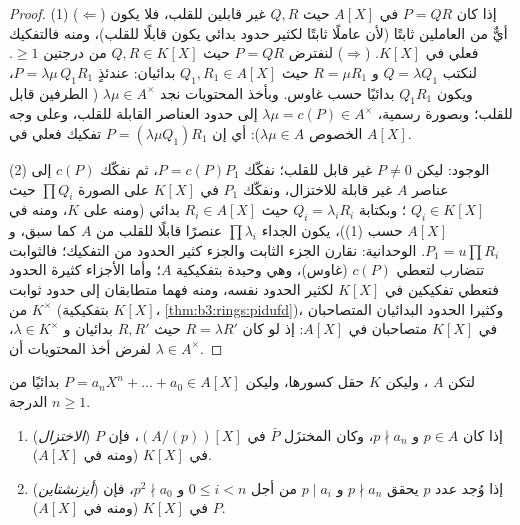 \begin{proof}
(1) ($\Leftarrow$) إذا كان $P = QR$ في $A[X]$ حيث $Q, R$ غير
قابلين للقلب، فلا يكون أيٌّ من العاملين ثابتًا (لأن عاملًا ثابتًا
لكثير حدود بدائي يكون قابلًا للقلب)، ومنه فالتفكيك فعلي في
$K[X]$. ($\Rightarrow$) لنفترض $P = QR$ حيث $Q, R \in K[X]$ من
درجتين $\geq 1$. لنكتب $Q = \lambda Q_1$ و $R = \mu R_1$ حيث $Q_1, R_1
\in A[X]$
بدائيان: عندئذٍ $P = \lambda\mu\, Q_1R_1$، ويكون $Q_1R_1$ بدائيًا حسب غاوس.
وبأخذ المحتويات نجد $\lambda\mu \in A^\times$ ( الطرفين قابل للقلب؛ وبصورة
رسمية، $\lambda\mu = c(P) \in
A^\times$ إلى حدود العناصر القابلة للقلب، وعلى وجه الخصوص
$\lambda \mu \in A$): أي إن $P
= (\lambda\mu Q_1) R_1$ تفكيك فعلي في $A[X]$.

(2) الوجود: ليكن $P \neq 0$ غير قابل للقلب؛ نفكّك $P = c(P)P_1$،
ثم نفكّك $c(P)$ إلى عناصر $A$ غير قابلة للاختزال، ونفكّك $P_1$
في  $K[X]$ على الصورة $\prod Q_i$ حيث
$Q_i \in K[X]$ ؛ وبكتابة $Q_i = \lambda_i R_i$ حيث
$R_i \in A[X]$ بدائي (ومنه  على $K$، ومنه في
$A[X]$ حسب (1))، يكون الجداء $\prod \lambda_i$ عنصرًا قابلًا للقلب من $A$
كما سبق، و $P_1 = u\prod
R_i$. الوحدانية: نقارن الجزء الثابت والجزء
كثير الحدود من التفكيك؛ فالثوابت تتضارب لتعطي $c(P)$ (غاوس)،
وهي وحيدة بتفكيكية $A$؛ وأما الأجزاء كثيرة الحدود فتعطي تفكيكين
في $K[X]$ لكثير الحدود نفسه، ومنه فهما متطابقان إلى حدود ثوابت
من $K^\times$ (بتفكيكية $K[X]$، \cref{thm:b3:rings:pidufd})، وكثيرا الحدود
البدائيان المتصاحبان في $K[X]$ متصاحبان في $A[X]$: إذ لو كان
$R = \lambda R'$ حيث $R, R'$ بدائيان و $\lambda \in K^\times$، لفرض أخذ
المحتويات أن $\lambda \in A^\times$.
\end{proof}

\begin{theorem}\label{thm:b3:rings:criteria}
لتكن $A$ ، وليكن $K$ حقل كسورها، وليكن $P = a_nX^n + \dots
+ a_0 \in A[X]$
بدائيًا من الدرجة $n \geq 1$.
\begin{enumerate}
  \item (\emph{الاختزال}) إذا كان $p \in A$  و
        $p \nmid a_n$، وكان المختزَل $\bar P$ 
        في $(A/(p))[X]$، فإن $P$  في $K[X]$
        (ومنه في $A[X]$).
  \item (\emph{أيزنشتاين}) إذا وُجد عدد
         $p$ يحقق $p \nmid a_n$ و $p \mid a_i$ من أجل
        $0
        \leq i < n$ و $p^2 \nmid a_0$، فإن $P$  في
        $K[X]$ (ومنه في $A[X]$).
\end{enumerate}
\end{theorem}

